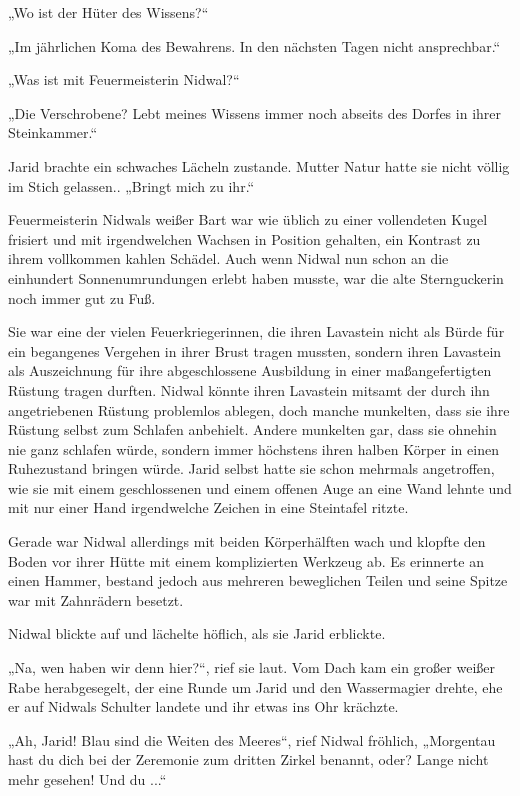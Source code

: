 „Wo ist der Hüter des Wissens?“

„Im jährlichen Koma des Bewahrens. In den nächsten Tagen nicht ansprechbar.“

„Was ist mit Feuermeisterin Nidwal?“

„Die Verschrobene? Lebt meines Wissens immer noch abseits des Dorfes in ihrer Steinkammer.“

Jarid brachte ein schwaches Lächeln zustande. Mutter Natur hatte sie nicht völlig im Stich gelassen.. „Bringt mich zu ihr.“\bigskip







Feuermeisterin Nidwals weißer Bart war wie üblich zu einer vollendeten Kugel frisiert und mit irgendwelchen Wachsen in Position gehalten, ein Kontrast zu ihrem vollkommen kahlen Schädel. Auch wenn Nidwal nun schon an die einhundert Sonnenumrundungen erlebt haben musste, war die alte Sternguckerin noch immer gut zu Fuß.

Sie war eine der vielen Feuerkriegerinnen, die ihren Lavastein nicht als Bürde für ein begangenes Vergehen in ihrer Brust tragen mussten, sondern ihren Lavastein als Auszeichnung für ihre abgeschlossene Ausbildung in einer maßangefertigten Rüstung tragen durften. Nidwal könnte ihren Lavastein mitsamt der durch ihn angetriebenen Rüstung problemlos ablegen, doch manche munkelten, dass sie ihre Rüstung selbst zum Schlafen anbehielt. Andere munkelten gar, dass sie ohnehin nie ganz schlafen würde, sondern immer höchstens ihren halben Körper in einen Ruhezustand bringen würde. Jarid selbst hatte sie schon mehrmals angetroffen, wie sie mit einem geschlossenen und einem offenen Auge an eine Wand lehnte und mit nur einer Hand irgendwelche Zeichen in eine Steintafel ritzte.

Gerade war Nidwal allerdings mit beiden Körperhälften wach und klopfte den Boden vor ihrer Hütte mit einem komplizierten Werkzeug ab. Es erinnerte an einen Hammer, bestand jedoch aus mehreren beweglichen Teilen und seine Spitze war mit Zahnrädern besetzt.

Nidwal blickte auf und lächelte höflich, als sie Jarid erblickte.

„Na, wen haben wir denn hier?“, rief sie laut. Vom Dach kam ein großer weißer Rabe herabgesegelt, der eine Runde um Jarid und den Wassermagier drehte, ehe er auf Nidwals Schulter landete und ihr etwas ins Ohr krächzte.

„Ah, Jarid! Blau sind die Weiten des Meeres“, rief Nidwal fröhlich, „Morgentau hast du dich bei der Zeremonie zum dritten Zirkel benannt, oder? Lange nicht mehr gesehen! Und du ...“

